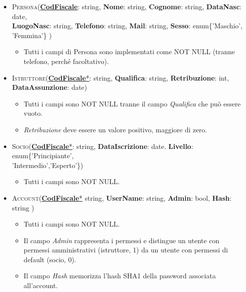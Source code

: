 \begin{itemize}
\item \textsc{Persona}(\underline{\textbf{CodFiscale}}: string, \textbf{Nome}: string, \textbf{Cognome}: string, \textbf{DataNasc}: date,\\ \textbf{LuogoNasc}: string, \textbf{Telefono}: string,  \textbf{Mail}: string, \textbf{Sesso}: enum\{'Maschio', 'Femmina'\} ) 
\begin{itemize}
\item Tutti i campi di Persona sono implementati come NOT NULL (tranne telefono, perché facoltativo).
\end{itemize}

\item \textsc{Istruttore}(\underline{\textbf{CodFiscale}*}: string, \textbf{Qualifica}: string, \textbf{Retribuzione}: int, \textbf{DataAssunzione}: date)
\begin{itemize}
\item Tutti i campi sono NOT NULL tranne il campo \textit{Qualifica} che può essere vuoto.
\item \textit{Retribuzione} deve essere un valore positivo, maggiore di zero.
\end{itemize}

\item \textsc{Socio}(\underline{\textbf{CodFiscale}*}: string, \textbf{DataIscrizione}: date. \textbf{Livello}: enum\{'Principiante',\\'Intermedio','Esperto'\})  
\begin{itemize}
\item Tutti i campi sono NOT NULL.
\end{itemize}

\item \textsc{Account}(\underline{\textbf{CodFiscale}*} string, \textbf{UserName}: string, \textbf{Admin}: bool, \textbf{Hash}: string )
\begin{itemize}
\item Tutti i campi sono NOT NULL.
\item Il campo \textit{Admin} rappresenta i permessi e distingue un utente con permessi amministrativi (istruttore, 1) da un utente con permessi di default (socio, 0).
\item Il campo \textit{Hash} memorizza l'hash SHA1 della password associata all'account.
\end{itemize}


\end{itemize}
